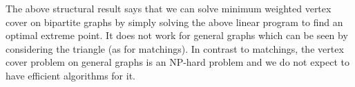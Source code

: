 The above structural result says that we can solve minimum weighted vertex cover on bipartite
graphs by simply solving the above linear program to find an optimal extreme point. It does not
work for general graphs which can be seen by considering the triangle (as for matchings). In
contrast to matchings, the vertex cover problem on general graphs is an NP-hard problem and we do
not expect to have efficient algorithms for it.

% 
